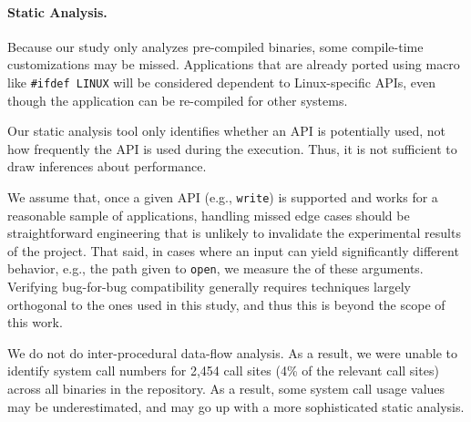 
\paragraph{Static Analysis.}
Because our study only analyzes pre-compiled binaries, some compile-time customizations may be missed.
Applications that are already ported using macro like {\tt \#ifdef LINUX} will be considered dependent to Linux-specific APIs,
even though the application can be re-compiled for other systems.

Our static analysis tool only identifies 
whether an API is potentially used,
not how frequently the API is used during the execution.
Thus, it is not sufficient to draw inferences about performance.



We assume that, once a given API (e.g., {\tt write}) is supported and works for a reasonable sample of applications,
handling missed edge cases should be straightforward engineering that is unlikely to invalidate the experimental results of the project.
That said, in cases where an input can yield significantly different behavior, e.g.,
the path given to {\tt open},
we measure the \usagemetric{} of these arguments.
Verifying bug-for-bug compatibility generally requires techniques largely orthogonal to the ones used in this study,
and thus this is beyond the scope of this work.

We do not do inter-procedural data-flow analysis.  As a result,
we were unable to identify system call numbers for 2,454 call sites (4\% of the
relevant call sites)
across all binaries in the repository.  As a result,
some system call usage values may be underestimated, and may go up 
with a more sophisticated static analysis.





